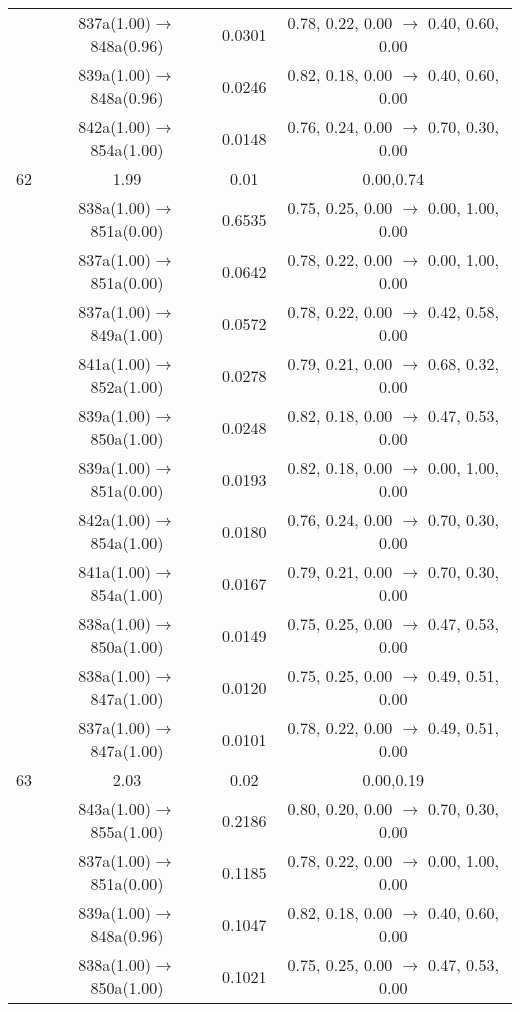 \documentclass[10pt,a4paper]{article}
\begin{document}
\begin{longtable}{c|c|c|c}
 	& 837a(1.00)$\rightarrow$848a(0.96) &	 0.0301 &	 0.78, 0.22, 0.00 $\rightarrow$ 0.40, 0.60, 0.00 \\ 
 	& 839a(1.00)$\rightarrow$848a(0.96) &	 0.0246 &	 0.82, 0.18, 0.00 $\rightarrow$ 0.40, 0.60, 0.00 \\ 
 	& 842a(1.00)$\rightarrow$854a(1.00) &	 0.0148 &	 0.76, 0.24, 0.00 $\rightarrow$ 0.70, 0.30, 0.00 \\ 
 \hline62 &	 1.99 &	 0.01 &	 0.00,0.74 \\ 
  	& 838a(1.00)$\rightarrow$851a(0.00) &	 0.6535 &	 0.75, 0.25, 0.00 $\rightarrow$ 0.00, 1.00, 0.00 \\ 
 	& 837a(1.00)$\rightarrow$851a(0.00) &	 0.0642 &	 0.78, 0.22, 0.00 $\rightarrow$ 0.00, 1.00, 0.00 \\ 
 	& 837a(1.00)$\rightarrow$849a(1.00) &	 0.0572 &	 0.78, 0.22, 0.00 $\rightarrow$ 0.42, 0.58, 0.00 \\ 
 	& 841a(1.00)$\rightarrow$852a(1.00) &	 0.0278 &	 0.79, 0.21, 0.00 $\rightarrow$ 0.68, 0.32, 0.00 \\ 
 	& 839a(1.00)$\rightarrow$850a(1.00) &	 0.0248 &	 0.82, 0.18, 0.00 $\rightarrow$ 0.47, 0.53, 0.00 \\ 
 	& 839a(1.00)$\rightarrow$851a(0.00) &	 0.0193 &	 0.82, 0.18, 0.00 $\rightarrow$ 0.00, 1.00, 0.00 \\ 
 	& 842a(1.00)$\rightarrow$854a(1.00) &	 0.0180 &	 0.76, 0.24, 0.00 $\rightarrow$ 0.70, 0.30, 0.00 \\ 
 	& 841a(1.00)$\rightarrow$854a(1.00) &	 0.0167 &	 0.79, 0.21, 0.00 $\rightarrow$ 0.70, 0.30, 0.00 \\ 
 	& 838a(1.00)$\rightarrow$850a(1.00) &	 0.0149 &	 0.75, 0.25, 0.00 $\rightarrow$ 0.47, 0.53, 0.00 \\ 
 	& 838a(1.00)$\rightarrow$847a(1.00) &	 0.0120 &	 0.75, 0.25, 0.00 $\rightarrow$ 0.49, 0.51, 0.00 \\ 
 	& 837a(1.00)$\rightarrow$847a(1.00) &	 0.0101 &	 0.78, 0.22, 0.00 $\rightarrow$ 0.49, 0.51, 0.00 \\ 
 \hline63 &	 2.03 &	 0.02 &	 0.00,0.19 \\ 
  	& 843a(1.00)$\rightarrow$855a(1.00) &	 0.2186 &	 0.80, 0.20, 0.00 $\rightarrow$ 0.70, 0.30, 0.00 \\ 
 	& 837a(1.00)$\rightarrow$851a(0.00) &	 0.1185 &	 0.78, 0.22, 0.00 $\rightarrow$ 0.00, 1.00, 0.00 \\ 
 	& 839a(1.00)$\rightarrow$848a(0.96) &	 0.1047 &	 0.82, 0.18, 0.00 $\rightarrow$ 0.40, 0.60, 0.00 \\ 
 	& 838a(1.00)$\rightarrow$850a(1.00) &	 0.1021 &	 0.75, 0.25, 0.00 $\rightarrow$ 0.47, 0.53, 0.00 \\ 

\end{longtable}
\end{document}

